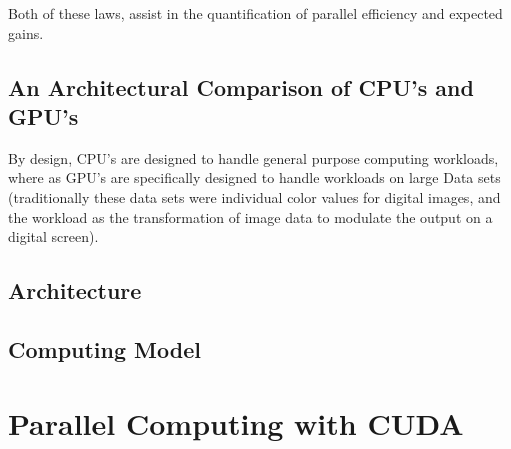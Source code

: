 Both of these laws, assist in the quantification of parallel efficiency and
expected gains.



\subsection{An Architectural Comparison of CPU's and GPU's}

By design, CPU's are designed to handle general purpose computing workloads, where as GPU's are
specifically designed to handle workloads on large Data sets (traditionally these
data sets were individual color values for digital images, and the workload as
the transformation of image data to modulate the output on a digital screen).
\subsection{Architecture}
\subsection{Computing Model}

\section{Parallel Computing with CUDA}

